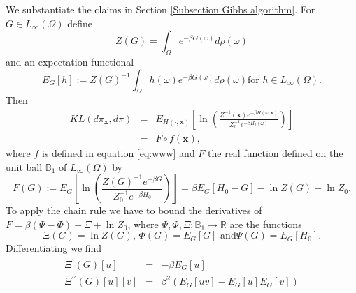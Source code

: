 \documentclass[final,12pt]{colt2018} %
\begin{document}
						We substantiate the claims in Section \ref{Subsection Gibbs algorithm}. For $%
						G\in L_{\infty }\left( \Omega \right) $ define 
						\begin{equation*}
						Z\left( G\right) =\int_{\Omega }e^{-\beta G\left( \omega \right) }d\rho
						\left( \omega \right) 
						\end{equation*}%
						and an expectation functional%
						\begin{equation*}
						E_{G}\left[ h\right] :=Z\left( G\right) ^{-1}\int_{\Omega }h\left( \omega
						\right) e^{-\beta G\left( \omega \right) }d\rho \left( \omega \right) \text{
							for }h\in L_{\infty }\left( \Omega \right) .
						\end{equation*}%
						Then%
						\begin{eqnarray*}
							KL\left( d\pi _{\mathbf{x}},d\pi \right)  &=&E_{H\left( \cdot,\mathbf{x}\right) }%
							\left[ \ln \left( \frac{Z^{-1}\left( \mathbf{x}\right) e^{-\beta H\left(
									\omega ,\mathbf{x}\right) }}{Z_{0}^{-1}e^{-\beta H_{0}\left( \omega \right) }%
							}\right) \right]  \\
							&=&F\circ f\left( \mathbf{x}\right) ,
						\end{eqnarray*}%
						where $f$ is defined in equation \eqref{eq:www} and $F$ the real function defined on the unit ball $\mathbb{B}_{1}$ of $%
						L_{\infty }\left( \Omega \right) $ by%
						\begin{equation*}
						F\left( G\right) :=E_{G}\left[ \ln \left( \frac{Z\left( G\right)
							^{-1}e^{-\beta G}}{Z_{0}^{-1}e^{-\beta H_{0}}}\right) \right] =\beta E_{G}%
						\left[ H_{0}-G\right] -\ln Z\left( G\right) +\ln Z_{0}.
						\end{equation*}%
						To apply the chain rule we have to bound the derivatives of $F=\beta \left(
						\Psi -\Phi \right) -\Xi +\ln Z_{0}$, where $\Psi ,\Phi ,\Xi :\mathbb{B}%
						_{1}\rightarrow 
						\mathbb{R}
						$ are the functions%
						\begin{equation*}
						\Xi \left( G\right) =\ln Z\left( G\right) \text{, }\Phi \left( G\right)
						=E_{G}\left[ G\right] \text{ and}\Psi \left( G\right) =E_{G}\left[ H_{0}%
						\right] \text{.}
						\end{equation*}%
						Differentiating we find 
						\begin{eqnarray*}
							\Xi ^{\prime }\left( G\right) \left[ u\right]  &=&-\beta E_{G}\left[ u\right]
							\\
							\Xi ^{\prime \prime }\left( G\right) \left[ u\right] \left[ v\right] 
							&=&\beta ^{2}\left( E_{G}\left[ uv\right] -E_{G}\left[ u\right] E_{G}\left[ v%
							\right] \right) 
						\end{eqnarray*}%
\end{document}
